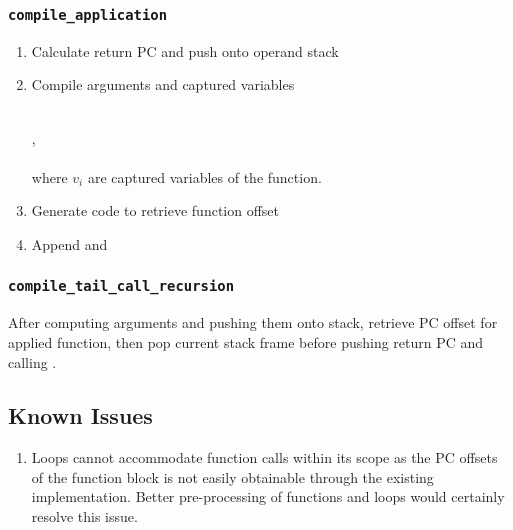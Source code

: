 \subsubsection{\texttt{compile\_application}}
\begin{enumerate}
    \item Calculate return PC and push onto operand stack
    \item Compile arguments and captured variables\\\\
    \begin{prooftree}
    \end{prooftree}, \\\\where $v_i$ are captured variables of the function. 
    \item Generate code to retrieve function offset
    \item Append  and 
\end{enumerate}

\subsubsection{\texttt{compile\_tail\_call\_recursion}}
After computing arguments and pushing them onto stack, retrieve PC offset for applied function, then pop current stack frame before pushing return PC and calling . 

\subsection{Known Issues}
\begin{enumerate}
    \item Loops cannot accommodate function calls within its scope as the PC offsets of the function block is not easily obtainable through the existing implementation. Better pre-processing of functions and loops would certainly resolve this issue.
\end{enumerate}